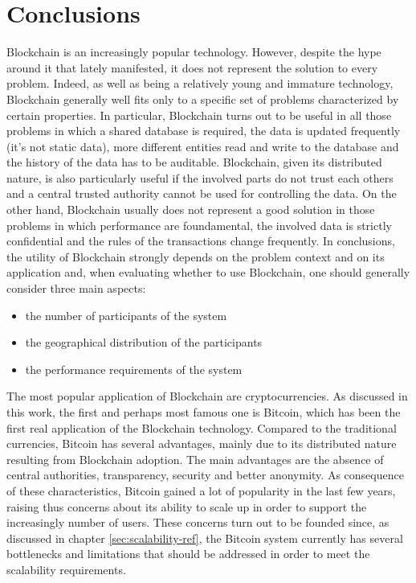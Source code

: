 \section{Conclusions}
Blockchain is an increasingly popular technology. However, despite the hype around it that lately manifested, it does not represent the solution to every problem. Indeed, as well as being a relatively young and immature technology, Blockchain generally well fits only to a specific set of problems characterized by certain properties. 
In particular, Blockchain turns out to be useful in all those problems in which a shared database is required, the data is updated frequently (it's not static data), more different entities read and write to the database and the history of the data has to be auditable. Blockchain, given its distributed nature, is also particularly useful if the involved parts do not trust each others and a central trusted authority cannot be used for controlling the data. On the other hand, Blockchain usually does not represent a good solution in those problems in which performance are foundamental, the involved data is strictly confidential and the rules of the transactions change frequently. In conclusions, the utility of Blockchain strongly depends on the problem context and on its application and, when evaluating whether to use Blockchain, one should generally consider three main aspects: 


\begin{itemize}
    \item the number of participants of the system
    \item the geographical distribution of the participants
    \item the performance requirements of the system
\end{itemize}

The most popular application of Blockchain are cryptocurrencies. As discussed in this work, the first and perhaps most famous one is Bitcoin, which has been the first real application of the Blockchain technology. Compared to the traditional currencies, Bitcoin has several advantages, mainly due to its distributed nature resulting from Blockchain adoption. The main advantages are the absence of central authorities, transparency, security and better anonymity. As consequence of these characteristics, Bitcoin gained a lot of popularity in the last few years, raising thus concerns about its ability to scale up in order to support the increasingly number of users. These concerns turn out to be founded since, as discussed in chapter \ref{sec:scalability-ref}, the Bitcoin system currently has several bottlenecks and limitations that should be addressed in order to meet the scalability requirements.

